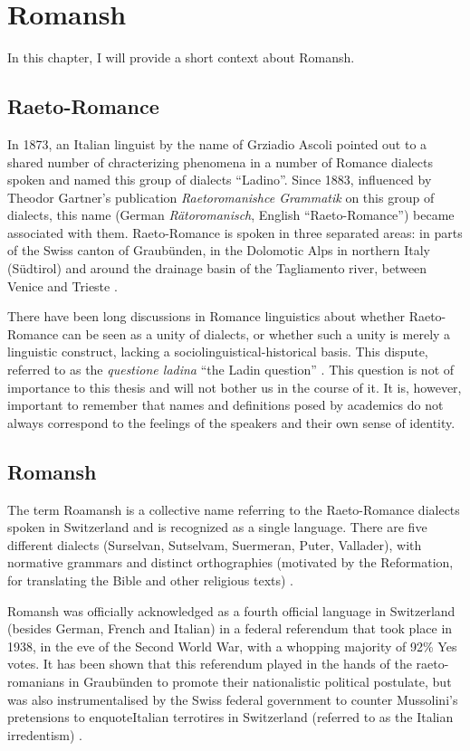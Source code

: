 \chapter{Romansh}

In this chapter, I will provide a short context about Romansh.

\section{Raeto-Romance}
In 1873, an Italian linguist by the name of Grziadio Ascoli pointed out to a shared number of chracterizing phenomena in a number of Romance dialects spoken and named this group of dialects \enquote{Ladino}. 
Since 1883, influenced by Theodor Gartner's publication \emph{Raetoromanishce Grammatik} on this group of dialects, this name (German \emph{Rätoromanisch}, English \enquote{Raeto-Romance}) became associated with them. 
Raeto-Romance is spoken in three separated areas: in parts of the Swiss canton of Graubünden, in the Dolomotic Alps in northern Italy (Südtirol) and around the drainage basin of the Tagliamento river, between Venice and Trieste \autocite[1]{haiman1992}.

There have been long discussions in Romance linguistics about whether Raeto-Romance can be seen as a unity of dialects, or whether such a unity is merely a linguistic construct, lacking a sociolinguistical-historical basis. 
This dispute, referred to as the \emph{questione ladina} \enquote{the Ladin question} \autocite{liver1999}. 
This question is not of importance to this thesis and will not bother us in the course of it. 
It is, however, important to remember that names and definitions posed by academics do not always correspond to the feelings of the speakers and their own sense of identity.

\section{Romansh}
The term Roamansh is a collective name referring to the Raeto-Romance dialects spoken in Switzerland and is recognized as a single language. 
There are five different dialects (Surselvan, Sutselvam, Suermeran, Puter, Vallader), with normative grammars and distinct orthographies (motivated by the Reformation, for translating the Bible and other religious texts) \autocite[1]{haiman1992}.

Romansh was officially acknowledged as a fourth official language in Switzerland (besides German, French and Italian) in a federal referendum that took place in 1938, in the eve of the Second World War, with a whopping majority of 92\% Yes votes. 
It has been shown that this referendum played in the hands of the raeto-romanians in Graubünden to promote their nationalistic political postulate, but was also instrumentalised by the Swiss federal government to counter Mussolini's pretensions to enquote{Italian} terrotires in Switzerland (referred to as the Italian irredentism) \autocite{valaer2012}.

